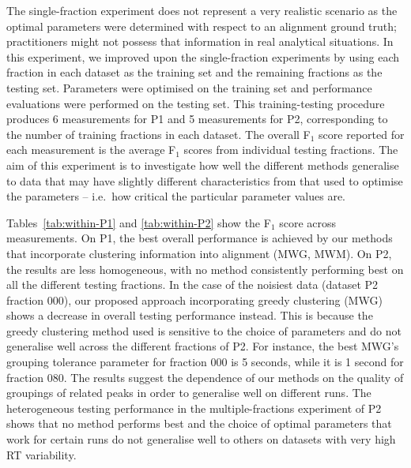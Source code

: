 The single-fraction experiment does not represent a very realistic scenario as the optimal parameters were determined with respect to an alignment ground truth; practitioners might not possess that information in real analytical situations. In this experiment, we improved upon the single-fraction experiments by using each fraction in each dataset as the training set and the remaining fractions as the testing set. Parameters were optimised on the training set and performance evaluations were performed on the testing set. This training-testing procedure produces 6 measurements for P1 and 5 measurements for P2, corresponding to the number of training fractions in each dataset. The overall F$_1$ score reported for each measurement is the average F$_1$ scores from individual testing fractions. The aim of this experiment is to investigate how well the different methods generalise to data that may have slightly different characteristics from that used to optimise the parameters -- i.e.\ how critical the particular parameter values are.

Tables~\ref{tab:within-P1} and \ref{tab:within-P2} show the F$_{1}$ score across measurements. On P1, the best overall performance is achieved by our methods that incorporate clustering information into alignment (MWG, MWM). On P2, the results are less homogeneous, with no method consistently performing best on all the different testing fractions. In the case of the noisiest data (dataset P2 fraction 000), our proposed approach incorporating greedy clustering (MWG) shows a decrease in overall testing performance instead. This is because the greedy clustering method used is sensitive to the choice of parameters and do not generalise well across the different fractions of P2. For instance, the best MWG's grouping tolerance parameter for fraction 000 is 5 seconds, while it is 1 second for fraction 080. The results suggest the dependence of our methods on the quality of groupings of related peaks in order to generalise well on different runs. The heterogeneous testing performance in the multiple-fractions experiment of P2 shows that no method performs best and the choice of optimal parameters that work for certain runs do not generalise well to others on datasets with very high RT variability.


